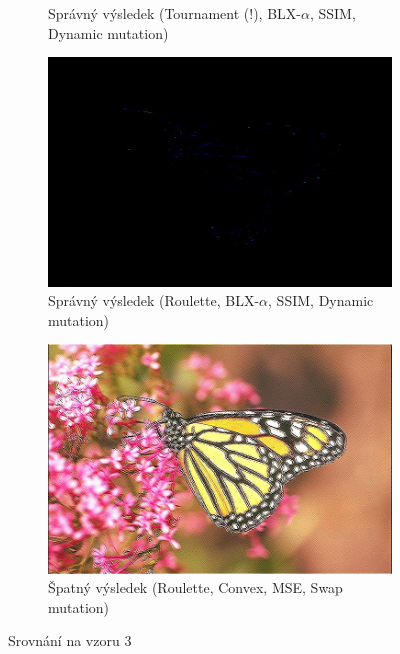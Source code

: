\documentclass[a4paper,11pt,titlepage]{scrartcl}
\begin{document}
\begin{figure}[!h]
\begin{subfigure}[b]{0.32\textwidth}
        \caption{Správný výsledek (Tournament (!), BLX-$\alpha$, SSIM, Dynamic mutation)}
        \label{fig:ex31}
    \end{subfigure}
    \begin{subfigure}[b]{0.32\textwidth}
        \includegraphics[width=\textwidth]{img/roulette-blx_a-ssim-dynamic_example3.jpg}
        \caption{Správný výsledek (Roulette, BLX-$\alpha$, SSIM, Dynamic mutation)}
        \label{fig:ex32}
    \end{subfigure}
    \begin{subfigure}[b]{0.32\textwidth}
        \includegraphics[width=\textwidth]{img/roulette-convex-mse-swap_example3.jpg}
        \caption{Špatný výsledek (Roulette, Convex, MSE, Swap mutation)}
        \label{fig:ex33}
    \end{subfigure}
    \caption{Srovnání na vzoru 3}
    \label{porovnani_ex3}
\end{figure}
\end{document}
